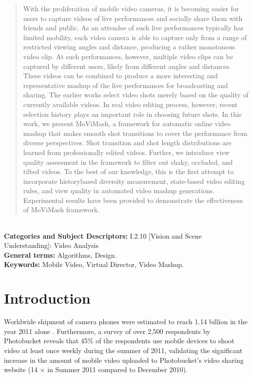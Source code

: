 \documentclass{sig-alternate}
\begin{document}
\maketitle
\begin{abstract}
With the proliferation of mobile video cameras, it is becoming easier
for users to capture videos of live performances and socially
share them with friends and public. As an attendee of such live
performances typically has limited mobility, each video camera is
able to capture only from a range of restricted viewing angles and
distance, producing a rather monotonous video clip. At such performances,
however, multiple video clips can be captured by different
users, likely from different angles and distances. These videos
can be combined to produce a more interesting and representative
mashup of the live performances for broadcasting and sharing. The
earlier works select video shots merely based on the quality of currently
available videos. In real video editing process, however, recent
selection history plays an important role in choosing future
shots. In this work, we present MoViMash, a framework for automatic
online video mashup that makes smooth shot transitions to
cover the performance from diverse perspectives. Shot transition
and shot length distributions are learned from professionally edited
videos. Further, we introduce view quality assessment in the framework
to filter out shaky, occluded, and tilted videos. To the best
of our knowledge, this is the first attempt to incorporate historybased
diversity measurement, state-based video editing rules, and
view quality in automated video mashup generations. Experimental
results have been provided to demonstrate the effectiveness of
MoViMash framework.
\end{abstract}\\
\textbf{Categories and Subject Descriptors:} I.2.10 [Vision and Scene Understanding]: Video Analysis\\
\textbf{General terms:} Algorithms, Design.\\
\textbf{Keywords:} Mobile Video, Virtual Director, Video Mashup.


\section{Introduction}\label{intro}
Worldwide shipment of camera phones were estimated to reach
1.14 billion in the year 2011 alone \cite{1}. Furthermore, a survey of over 2,500 respondents by Photobucket reveals that 45\% of the respondents use mobile devices to shoot video at least once weekly during the summer of 2011, validating the significant increase in
the amount of mobile video uploaded to Photobucket's video sharing
website (14 $\times$ in Summer 2011 compared to December 2010)\cite{2}.
\end{document}
